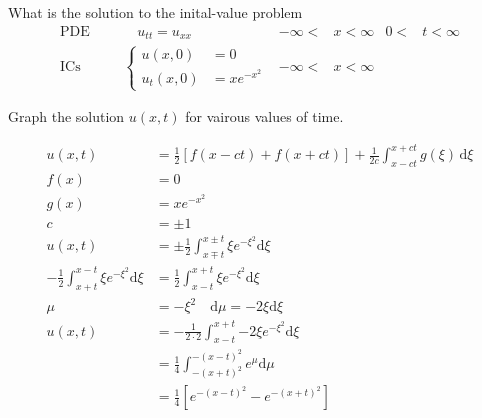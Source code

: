 \documentclass{article}
\begin{document}
What is the solution to the inital-value problem
\begin{align*}
  \text{PDE}&&&\quad u_{tt}=u_{xx}&-\infty<&x<\infty&0<&t<\infty\\
  \text{ICs}&&&\begin{cases}u(x,0)&=0\\u_t(x,0)&=xe^{-x^2}\end{cases}&-\infty<&x<\infty
\end{align*}

Graph the solution $u(x,t)$ for vairous values of time.

\begin{align*}
  u(x,t)&=\frac{1}{2}\left[f(x-ct)+f(x+ct)\right]+\frac{1}{2c}\int_{x-ct}^{x+ct}{g(\xi)\,\mathrm{d}\xi}\\
  f(x)&=0\\
  g(x)&=xe^{-x^2}\\
  c&=\pm1\\
  u(x,t)&=\pm\frac{1}{2}\int_{x\mp t}^{x\pm t}{\xi e^{-\xi^2}\mathrm{d}\xi}\\
  -\frac{1}{2}\int_{x+t}^{x-t}{\xi e^{-\xi^2}\mathrm{d}\xi}&=\frac{1}{2}\int_{x-t}^{x+t}{\xi e^{-\xi^2}\mathrm{d}\xi}\\
  \mu&=-\xi^2\quad \mathrm{d}\mu=-2\xi\mathrm{d}\xi\\
  u(x,t)&=-\frac{1}{2\cdot2}\int_{x-t}^{x+t}{-2\xi e^{-\xi^2}\mathrm{d}\xi}\\
  &=\frac{1}{4}\int_{-(x+t)^2}^{-(x-t)^2}{e^\mu\mathrm{d}\mu}\\
  &=\frac{1}{4}\left[e^{-(x-t)^2}-e^{-(x+t)^2}\right]
\end{align*}

\end{document}
